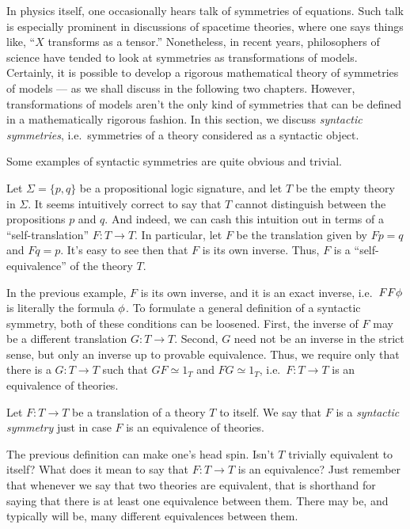 In physics itself, one occasionally hears talk of symmetries of
equations.  Such talk is especially prominent in discussions of
spacetime theories, where one says things like, ``$X$ transforms as a
tensor.''  Nonetheless, in recent years, philosophers of science have
tended to look at symmetries as transformations of models.  Certainly,
it is possible to develop a rigorous mathematical theory of symmetries
of models --- as we shall discuss in the following two chapters.
However, transformations of models aren't the only kind of symmetries
that can be defined in a mathematically rigorous fashion.  In this
section, we discuss \emph{syntactic symmetries}, i.e.\ symmetries of a
theory considered as a syntactic object.

Some examples of syntactic symmetries are quite obvious and trivial.

\begin{example} Let $\Sigma = \{ p,q\}$ be a propositional logic
  signature, and let $T$ be the empty theory in $\Sigma$.  It seems
  intuitively correct to say that $T$ cannot distinguish between the
  propositions $p$ and $q$.  And indeed, we can cash this intuition
  out in terms of a ``self-translation'' $F:T\to T$.  In particular,
  let $F$ be the translation given by $Fp=q$ and $Fq=p$.  It's easy to
  see then that $F$ is its own inverse.  Thus, $F$ is a
  ``self-equivalence'' of the theory $T$.
\end{example}

In the previous example, $F$ is its own inverse, and it is an exact
inverse, i.e.\ $FF\phi$ is literally the formula $\phi$.  To formulate a
general definition of a syntactic symmetry, both of these conditions
can be loosened.  First, the inverse of $F$ may be a different
translation $G:T\to T$.  Second, $G$ need not be an inverse in the
strict sense, but only an inverse up to provable equivalence.  Thus,
we require only that there is a $G:T\to T$ such that $GF\simeq 1_T$
and $FG\simeq 1_T$, i.e.\ $F:T\to T$ is an equivalence of theories.

\begin{defn} Let $F:T\to T$ be a translation of a theory $T$ to
  itself.  We say that $F$ is a \emph{syntactic symmetry} just in case
  $F$ is an equivalence of theories. \end{defn}

\begin{disc} The previous definition can make one's head spin.  Isn't
  $T$ trivially equivalent to itself?  What does it mean to say that
  $F:T\to T$ is an equivalence?  Just remember that whenever we say
  that two theories are equivalent, that is shorthand for saying that
  there is at least one equivalence between them.  There may be, and
  typically will be, many different equivalences between
  them. \end{disc}

